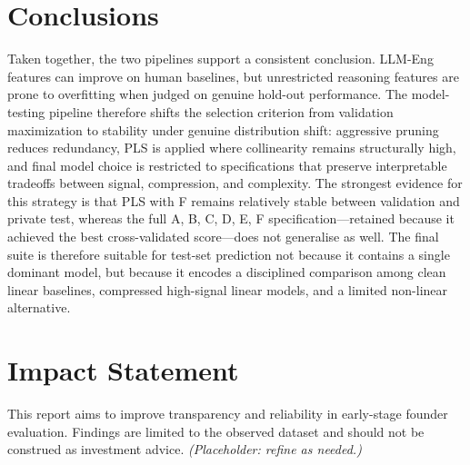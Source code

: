 \documentclass{article}
\theoremstyle{plain}
\theoremstyle{definition}
\theoremstyle{remark}
\begin{document}
\section{Conclusions}
Taken together, the two pipelines support a consistent conclusion. LLM-Eng features can improve on human baselines, but unrestricted reasoning features are prone to overfitting when judged on genuine hold-out performance. The model-testing pipeline therefore shifts the selection criterion from validation maximization to stability under genuine distribution shift: aggressive pruning reduces redundancy, PLS is applied where collinearity remains structurally high, and final model choice is restricted to specifications that preserve interpretable tradeoffs between signal, compression, and complexity. The strongest evidence for this strategy is that PLS with F remains relatively stable between validation and private test, whereas the full A, B, C, D, E, F specification---retained because it achieved the best cross-validated score---does not generalise as well. The final suite is therefore suitable for test-set prediction not because it contains a single dominant model, but because it encodes a disciplined comparison among clean linear baselines, compressed high-signal linear models, and a limited non-linear alternative.

\section*{Impact Statement}
This report aims to improve transparency and reliability in early-stage founder evaluation. Findings are limited to the observed dataset and should not be construed as investment advice. \textit{(Placeholder: refine as needed.)}









\end{document}
